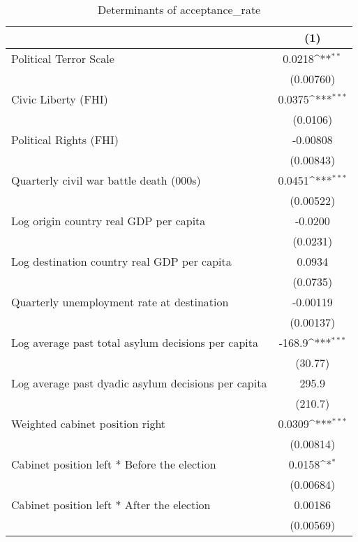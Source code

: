 \begin{table}[htbp]\centering
\def\sym#1{\ifmmode^{#1}\else\(^{#1}\)\fi}
\caption{Determinants of acceptance\_rate}
\begin{tabular}{l*{1}{c}}
\hline\hline
                    &\multicolumn{1}{c}{(1)}         \\
\hline
Political Terror Scale&      0.0218\sym{**} \\
                    &   (0.00760)         \\
[1em]
Civic Liberty (FHI) &      0.0375\sym{***}\\
                    &    (0.0106)         \\
[1em]
Political Rights (FHI)&    -0.00808         \\
                    &   (0.00843)         \\
[1em]
Quarterly civil war battle death (000s)&      0.0451\sym{***}\\
                    &   (0.00522)         \\
[1em]
Log origin country real GDP per capita&     -0.0200         \\
                    &    (0.0231)         \\
[1em]
Log destination country real GDP per capita&      0.0934         \\
                    &    (0.0735)         \\
[1em]
Quarterly unemployment rate at destination&    -0.00119         \\
                    &   (0.00137)         \\
[1em]
Log average past total asylum decisions per capita&      -168.9\sym{***}\\
                    &     (30.77)         \\
[1em]
Log average past dyadic asylum decisions per capita&       295.9         \\
                    &     (210.7)         \\
[1em]
Weighted cabinet position right&      0.0309\sym{***}\\
                    &   (0.00814)         \\
[1em]
Cabinet position left * Before the election&      0.0158\sym{*}  \\
                    &   (0.00684)         \\
[1em]
Cabinet position left * After the election&     0.00186         \\
                    &   (0.00569)         \\

\end{tabular}
\end{table}
